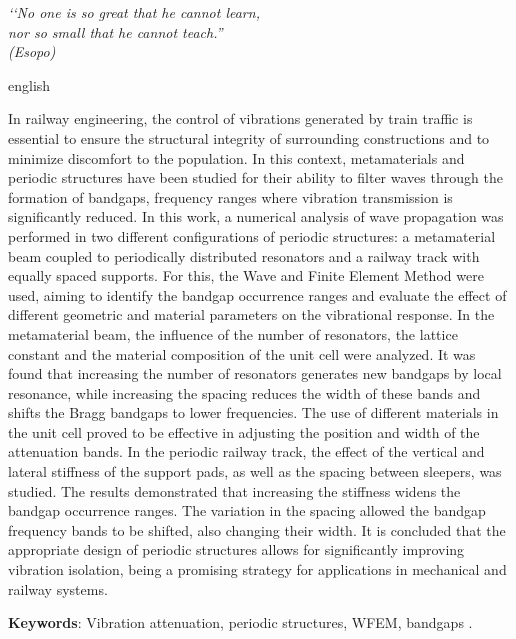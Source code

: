 \begin{epigrafe}
\vspace*{\fill}
\begin{flushright}
\textit{‘‘No one is so great that he cannot learn, \\ nor so small that he cannot teach.''\\
(Esopo)}
\end{flushright}
\end{epigrafe}


\begin{resumo}[Abstract]

\begin{otherlanguage*}{english}


In railway engineering, the control of vibrations generated by train traffic is essential to ensure the structural integrity of surrounding constructions and to minimize discomfort to the population. In this context, metamaterials and periodic structures have been studied for their ability to filter waves through the formation of bandgaps, frequency ranges where vibration transmission is significantly reduced.
In this work, a numerical analysis of wave propagation was performed in two different configurations of periodic structures: a metamaterial beam coupled to periodically distributed resonators and a railway track with equally spaced supports. For this, the Wave and Finite Element Method were used, aiming to identify the bandgap occurrence ranges and evaluate the effect of different geometric and material parameters on the vibrational response.
In the metamaterial beam, the influence of the number of resonators, the lattice constant and the material composition of the unit cell were analyzed. It was found that increasing the number of resonators generates new bandgaps by local resonance, while increasing the spacing reduces the width of these bands and shifts the Bragg bandgaps to lower frequencies. The use of different materials in the unit cell proved to be effective in adjusting the position and width of the attenuation bands.
In the periodic railway track, the effect of the vertical and lateral stiffness of the support pads, as well as the spacing between sleepers, was studied. The results demonstrated that increasing the stiffness widens the bandgap occurrence ranges. The variation in the spacing allowed the bandgap frequency bands to be shifted, also changing their width. It is concluded that the appropriate design of periodic structures allows for significantly improving vibration isolation, being a promising strategy for applications in mechanical and railway systems.






\noindent
\textbf{Keywords}: Vibration attenuation, periodic structures, WFEM, bandgaps . %

\end{otherlanguage*}%
\end{resumo}
